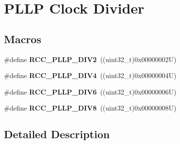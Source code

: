\hypertarget{group___r_c_c___p_l_l_p___clock___divider}{}\section{P\+L\+LP Clock Divider}
\label{group___r_c_c___p_l_l_p___clock___divider}
\subsection*{Macros}
\begin{DoxyCompactItemize}
\item 
\mbox{\label{group___r_c_c___p_l_l_p___clock___divider_ga16248cbd581f020b8a8d1cf0d9f0864d}} 
\#define {\bfseries R\+C\+C\+\_\+\+P\+L\+L\+P\+\_\+\+D\+I\+V2}~((uint32\+\_\+t)0x00000002\+U)
\item 
\mbox{\label{group___r_c_c___p_l_l_p___clock___divider_ga91b2c03c1f205addc5f52a1e740f801a}} 
\#define {\bfseries R\+C\+C\+\_\+\+P\+L\+L\+P\+\_\+\+D\+I\+V4}~((uint32\+\_\+t)0x00000004\+U)
\item 
\mbox{\label{group___r_c_c___p_l_l_p___clock___divider_ga5ad6be8ec0a6efaa1c81fbd29017a1fa}} 
\#define {\bfseries R\+C\+C\+\_\+\+P\+L\+L\+P\+\_\+\+D\+I\+V6}~((uint32\+\_\+t)0x00000006\+U)
\item 
\mbox{\label{group___r_c_c___p_l_l_p___clock___divider_gaab7662734bfff248c5dad97ea5f6736e}} 
\#define {\bfseries R\+C\+C\+\_\+\+P\+L\+L\+P\+\_\+\+D\+I\+V8}~((uint32\+\_\+t)0x00000008\+U)
\end{DoxyCompactItemize}


\subsection{Detailed Description}
